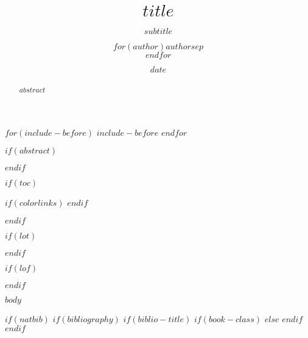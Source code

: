 \documentclass[doctor,twoside,chapterhead,otf]{znufethesis}
\title{$title$}
\title{}
\subtitle{$subtitle$}
\author{$for(author)$$author$$sep$ \\ $endfor$}
\author{}
\date{$date$}
\date{}
\begin{document}

\blankpage

$for(include-before)$
$include-before$
$endfor$

\cleardoublepage
{} %

\blankpage



\cleardoublepage
\frontmatter

\ifodd\therealpage
\blankpage
\fi

$if(abstract)$
\begin{abstract}
$abstract$
\end{abstract}
$endif$

$if(toc)$
{
$if(colorlinks)$
\hypersetup{linkcolor=$if(toccolor)$$toccolor$$else$black$endif$}
$endif$

\setcounter{tocdepth}{$toc-depth$}
\cleardoublepage
{} %
\tableofcontents        %

\ifodd\thepage
\blankpage
\fi
}
$endif$

$if(lot)$
\cleardoublepage
{} %
\listoftables           %

\ifodd\thepage
\blankpage
\fi
$endif$

$if(lof)$
\cleardoublepage
{} %
\listoffigures          %

\ifodd\thepage
\blankpage
\fi
$endif$

\mainmatter
\pagestyle{mpage}

$body$

\ifodd\thepage
\blankpage
\fi

\cleardoublepage
\pagestyle{emptypage}
\renewcommand{\chapterlabel}{\bibname}


$if(natbib)$
$if(bibliography)$
$if(biblio-title)$
$if(book-class)$
\renewcommand\bibname{$biblio-title$}
$else$
\renewcommand\refname{$biblio-title$}
$endif$
$endif$

\end{document}
